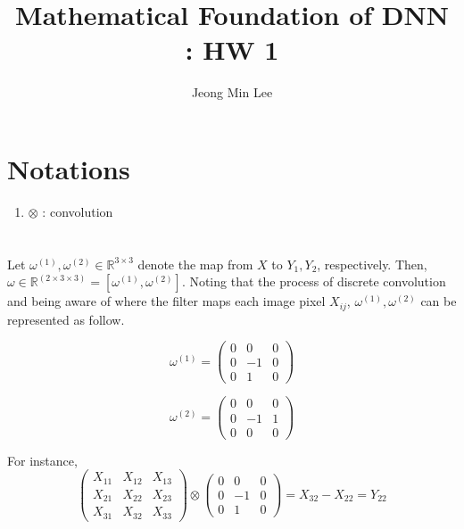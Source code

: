 \documentclass[10pt]{article}
\title{\textbf{Mathematical Foundation of DNN : HW 1}}
\author{Jeong Min Lee}
\begin{document}
\maketitle
\section*{Notations}
\begin{enumerate}
    \item $\otimes$ : convolution
\end{enumerate}
\section{}
Let $\omega^{(1)}, \omega^{(2)}\in\mathbb{R}^{3 \times 3}$ denote the map from $X$ to $Y_1, Y_2$, respectively. Then, 
$\omega \in \mathbb{R}^{(2\times 3 \times 3)} = [\omega^{(1)}, \omega^{(2)}]$.
Noting that the process of discrete convolution and being aware of where the filter maps each image pixel $X_{ij}$, 
$\omega^{(1)},\omega^{(2)}$ can be represented as follow.

\begin{equation}
    \omega^{(1)} = \begin{pmatrix}
        0 & 0 & 0 \\ 0 & -1 & 0 \\ 0 & 1 & 0
    \end{pmatrix}
\end{equation}

\begin{equation}
    \omega^{(2)} = \begin{pmatrix}
        0 & 0 & 0 \\ 0 & -1 & 1 \\ 0 & 0 & 0
    \end{pmatrix}
\end{equation}

For instance,
\begin{equation*}
    \begin{pmatrix}
        X_{11} & X_{12} & X_{13} \\ X_{21} & X_{22} & X_{23} \\ X_{31} & X_{32} & X_{33}
    \end{pmatrix}
    \otimes 
    \begin{pmatrix}
        0 & 0 & 0 \\ 0 & -1 & 0 \\ 0 & 1 & 0
    \end{pmatrix}
    = X_{32} - X_{22} = Y_{22}
\end{equation*}
\end{document}
